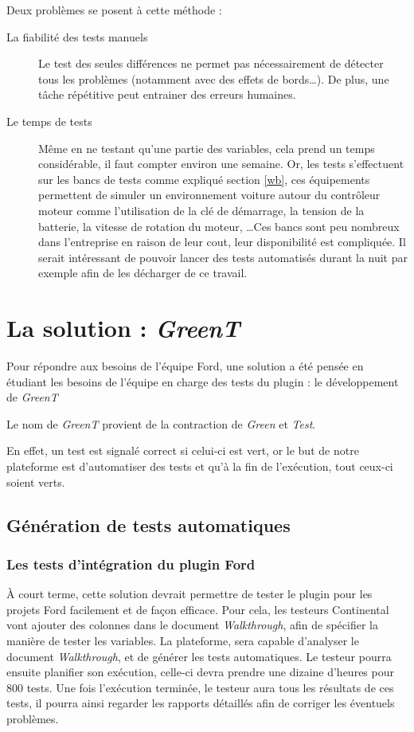 	\vspace{20px}
	Deux problèmes se posent à cette méthode : 
	\begin{description}
		\item[La fiabilité des tests manuels] Le test des seules différences ne permet pas nécessairement de détecter tous les problèmes (notamment avec des effets de bords\ldots). De plus, une tâche répétitive peut entrainer des erreurs humaines.
		\item[Le temps de tests] Même en ne testant qu'une partie des variables, cela prend un temps considérable, il faut compter environ une semaine.\newline
			Or, les tests s'effectuent sur les bancs de tests comme expliqué section \ref{wb}, ces équipements permettent de simuler un environnement voiture autour du contrôleur moteur comme
			l'utilisation de la clé de démarrage, la tension de la batterie, la vitesse de rotation du moteur, \ldots Ces bancs sont peu
			nombreux dans l'entreprise en raison de leur cout, leur disponibilité est compliquée. Il serait intéressant de pouvoir lancer
			des tests automatisés durant la nuit par exemple afin de les décharger de ce travail.
	\end{description}
	
\newpage
	\section{La solution : \textit{GreenT}}
	Pour répondre aux besoins de l'équipe Ford, une solution a été pensée en étudiant les besoins de l'équipe en charge des tests du plugin : le développement de \textit{GreenT}
	\begin{remarque}
		Le nom de \textit{GreenT} provient de la contraction de \textit{Green} et \textit{Test}.
		
		En effet, un test est signalé correct si celui-ci est vert, or le but de notre plateforme est d'automatiser des tests et qu'à la fin de l'exécution, tout ceux-ci soient verts.
	\end{remarque}
	
	\subsection{Génération de tests automatiques}
	\subsubsection{Les tests d'intégration du plugin Ford}
	À court terme, cette solution devrait permettre de tester le plugin pour les projets Ford facilement et de façon efficace. Pour cela, les testeurs Continental vont ajouter des colonnes dans le document \textit{Walkthrough}, afin de spécifier la manière de tester les variables. La plateforme, sera capable d'analyser le document \textit{Walkthrough}, et de générer les tests automatiques. Le testeur pourra ensuite planifier son exécution, celle-ci devra prendre une dizaine d'heures pour 800 tests. Une fois l'exécution terminée, le testeur aura tous les résultats de ces tests, il pourra ainsi regarder les rapports détaillés afin de corriger les éventuels problèmes.
	

